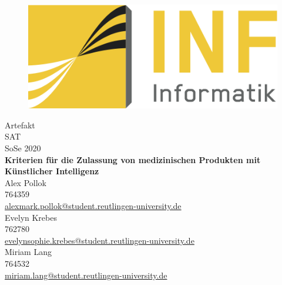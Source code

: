 \begin{titlepage}
    \begin{figure}
        \begin{flushright}
            \includegraphics[scale=0.75]{images/INFLogo.png}
        \end{flushright}
    \end{figure}

    \centering
    \vspace{1.5cm}
    {\Large Artefakt}\\

    \vspace{0.5cm}
    {\Large SAT}\\
    {\Large SoSe 2020}\\

    \vspace{1.0cm}
    \Large{\textbf{
            Kriterien für die Zulassung von medizinischen Produkten mit Künstlicher Intelligenz
          }
    }\\

    \vspace{1.0cm}
    {\small Alex Pollok}\\
    {\small 764359}\\
    {\small \href{mailto:alex_mark.pollok@student.reutlingen-university.de}{alex{\textunderscore}mark.pollok@student.reutlingen-university.de}}\\
    \vspace{0,5cm}
    {\small Evelyn Krebes}\\
    {\small 762780}\\
    {\small \href{mailto:evelyn_sophie.krebes@student.reutlingen-university.de}{evelyn{\textunderscore}sophie.krebes@student.reutlingen-university.de}}\\
    \vspace{0,5cm}
    {\small Miriam Lang}\\
    {\small 764532}\\
    {\small \href{mailto:miriam.lang@student.reutlingen-university.de}{miriam.lang@student.reutlingen-university.de}}\\


\end{titlepage}
